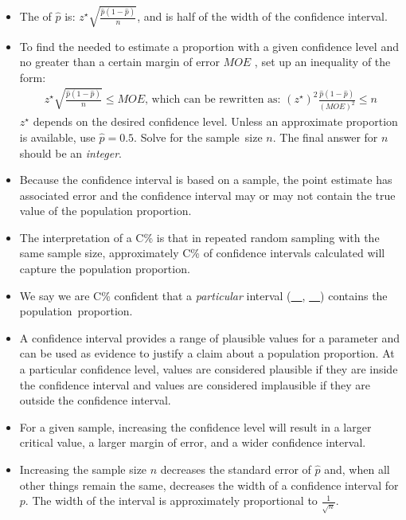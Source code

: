 \begin{itemize}
\item The  of $\hat{p}$ is: $z^{\star}\sqrt{\frac{\hat{p}(1-\hat{p})}{n}}$, and is half of the width of the confidence interval.

\item To find the  needed to estimate a proportion with a given confidence level and no greater than a certain margin of error $MOE$ , set up an inequality of the form:
\begin{align*}
z^{\star}\sqrt{\frac{\hat{p}(1-\hat{p})}{n}} \le MOE\text{, which can be rewritten as: }(z^{\star})^2\frac{\hat{p}(1-\hat{p})}{(MOE)^2} \le n
\end{align*}
$z^{\star}$ depends on the desired confidence level.  Unless an approximate proportion is available, use \mbox{$\hat{p}=0.5$.}  Solve for the sample~size $n$.  The final answer for $n$ should be an \textit{integer}.

\item Because the confidence interval is based on a sample, the point estimate has associated error and the confidence interval may or may not contain the true value of the population proportion.  

\item The interpretation of a C\%  is that in repeated random
sampling with the same sample size, approximately
C\% of confidence intervals calculated will capture the population proportion.

\item We say we are C\% confident that a \emph{particular} interval (\underline{\ \ }, \underline{\ \ }) contains the \mbox{population proportion.}

\item A confidence interval provides a range of plausible values for a parameter and can be used as evidence to justify a claim about a population proportion.  At a particular confidence level, values are considered plausible if they are inside the confidence interval and values are considered implausible if they are outside the confidence interval. 

\item For a given sample, increasing the confidence level will result in a larger critical value, a larger margin of error, and a wider confidence interval.

\item Increasing the sample size $n$ decreases the standard error of $\hat{p}$ and, when all other things remain the same, decreases the width of a confidence interval for $p$.  The width of the interval is approximately proportional to $\frac{1}{\sqrt{n}}$.


\end{itemize}


